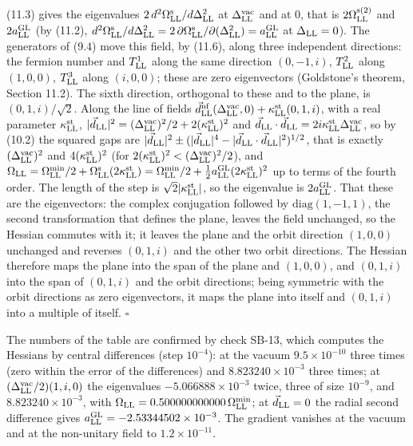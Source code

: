\documentclass[
  10pt,
]{article}
\begin{document}
(11.3) gives the eigenvalues
\(2\,d^2\Omega^{\rm s}_{\rm LL}/d\Delta_{\rm LL}^2\) at
\(\Delta^{\rm vac}_{\rm LL}\) and at 0, that is
\(2\Omega^{\rm s(2)}_{\rm LL}\) and \(2a^{\rm GL}_{\rm LL}\) (by (11.2),
\(d^2\Omega^{\rm s}_{\rm LL}/d\Delta_{\rm LL}^2=2\,\partial\Omega^{\rm s}_{\rm LL}/\partial(\Delta_{\rm LL}^2)=a^{\rm GL}_{\rm LL}\)
at \(\Delta_{\rm LL}=0\)). The generators of (9.4) move this field, by
(11.6), along three independent directions: the fermion number and
\(T^1_{\rm LL}\) along the same direction \((0,-1,i)\), \(T^2_{\rm LL}\)
along \((1,0,0)\), \(T^3_{\rm LL}\) along \((i,0,0)\); these are zero
eigenvectors (Goldstone's theorem, Section 11.2). The sixth direction,
orthogonal to these and to the plane, is \((0,1,i)/\sqrt2\). Along the
line of fields
\(\vec d^{\rm nf}_{\rm LL}(\Delta^{\rm vac}_{\rm LL},0)+\kappa^{\rm st}_{\rm LL}(0,1,i)\),
with a real parameter \(\kappa^{\rm st}_{\rm LL}\),
\(\lvert\vec d_{\rm LL}\rvert^2=(\Delta^{\rm vac}_{\rm LL})^2/2+2(\kappa^{\rm st}_{\rm LL})^2\)
and
\(\vec d_{\rm LL}\cdot\vec d_{\rm LL}=2i\kappa^{\rm st}_{\rm LL}\Delta^{\rm vac}_{\rm LL}\),
so by (10.2) the squared gaps are
\(\lvert\vec d_{\rm LL}\rvert^2\pm(\lvert\vec d_{\rm LL}\rvert^4-\lvert\vec d_{\rm LL}\cdot\vec d_{\rm LL}\rvert^2)^{1/2}\),
that is exactly \((\Delta^{\rm vac}_{\rm LL})^2\) and
\(4(\kappa^{\rm st}_{\rm LL})^2\) (for
\(2(\kappa^{\rm st}_{\rm LL})^2<(\Delta^{\rm vac}_{\rm LL})^2/2\)), and
\(\Omega_{\rm LL}=\Omega^{\rm min}_{\rm LL}/2+\Omega^{\rm s}_{\rm LL}(2\kappa^{\rm st}_{\rm LL})=\Omega^{\rm min}_{\rm LL}/2+\tfrac12a^{\rm GL}_{\rm LL}(2\kappa^{\rm st}_{\rm LL})^2\)
up to terms of the fourth order. The length of the step is
\(\sqrt2\lvert\kappa^{\rm st}_{\rm LL}\rvert\), so the eigenvalue is
\(2a^{\rm GL}_{\rm LL}\). That these are the eigenvectors: the complex
conjugation followed by \(\mathrm{diag}(1,-1,1)\), the second
transformation that defines the plane, leaves the field unchanged, so
the Hessian commutes with it; it leaves the plane and the orbit
direction \((1,0,0)\) unchanged and reverses \((0,1,i)\) and the other
two orbit directions. The Hessian therefore maps the plane into the span
of the plane and \((1,0,0)\), and \((0,1,i)\) into the span of
\((0,1,i)\) and the orbit directions; being symmetric with the orbit
directions as zero eigenvectors, it maps the plane into itself and
\((0,1,i)\) into a multiple of itself. \(\square\)

The numbers of the table are confirmed by check SB-13, which computes
the Hessians by central differences (step \(10^{-4}\)): at the vacuum
\(9.5\times10^{-10}\) three times (zero within the error of the
differences) and \(8.823240\times10^{-3}\) three times; at
\((\Delta^{\rm vac}_{\rm LL}/2)(1,i,0)\) the eigenvalues
\(-5.066888\times10^{-3}\) twice, three of size \(10^{-9}\), and
\(8.823240\times10^{-3}\), with
\(\Omega_{\rm LL}=0.500000000000\,\Omega^{\rm min}_{\rm LL}\); at
\(\vec d_{\rm LL}=0\) the radial second difference gives
\(a^{\rm GL}_{\rm LL}=-2.53344502\times10^{-3}\). The gradient vanishes
at the vacuum and at the non-unitary field to \(1.2\times10^{-11}\).
\end{document}
